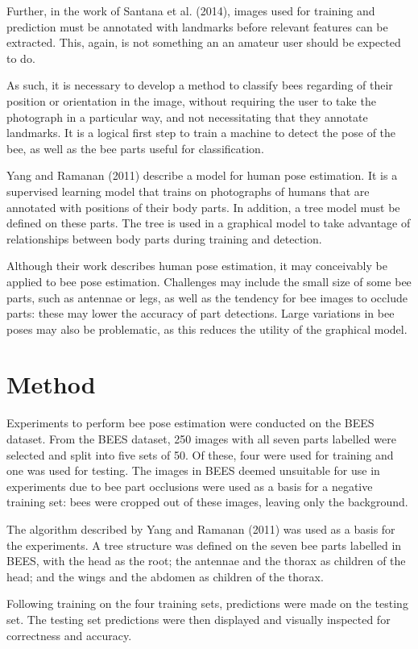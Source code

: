 \documentclass[11pt, oneside]{report}
\begin{document}
    Further, in the work of Santana et al. (2014), images used for training and prediction must be annotated with landmarks before relevant features can be extracted. This, again, is not something an an amateur user should be expected to do.

    As such, it is necessary to develop a method to classify bees regarding of their position or orientation in the image, without requiring the user to take the photograph in a particular way, and not necessitating that they annotate landmarks. It is a logical first step to train a machine to detect the pose of the bee, as well as the bee parts useful for classification.

    Yang and Ramanan (2011) describe a model for human pose estimation. It is a supervised learning model that trains on photographs of humans that are annotated with positions of their body parts. In addition, a tree model must be defined on these parts. The tree is used in a graphical model to take advantage of relationships between body parts during training and detection.

    Although their work describes human pose estimation, it may conceivably be applied to bee pose estimation. Challenges may include the small size of some bee parts, such as antennae or legs, as well as the tendency for bee images to occlude parts: these may lower the accuracy of part detections. Large variations in bee poses may also be problematic, as this reduces the utility of the graphical model.

\chapter{Method}
    Experiments to perform bee pose estimation were conducted on the BEES dataset. From the BEES dataset, 250 images with all seven parts labelled were selected and split into five sets of 50. Of these, four were used for training and one was used for testing. The images in BEES deemed unsuitable for use in experiments due to bee part occlusions were used as a basis for a negative training set: bees were cropped out of these images, leaving only the background.

    The algorithm described by Yang and Ramanan (2011) was used as a basis for the experiments. A tree structure was defined on the seven bee parts labelled in BEES, with the head as the root; the antennae and the thorax as children of the head; and the wings and the abdomen as children of the thorax.

    Following training on the four training sets, predictions were made on the testing set. The testing set predictions were then displayed and visually inspected for correctness and accuracy.
\end{document}
